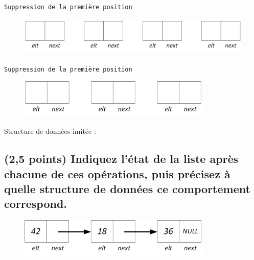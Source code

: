 \documentclass[11pt,a4paper]{article}
\begin{document}
\begin{center}
\texttt{Suppression de la première position}

\begin{figure}[ht!]
\centering
\centerline{  %
\includegraphics[height=1.85cm]{img/Liste_p_vide_4.png}
}
\end{figure}


\texttt{Suppression de la première position}

\begin{figure}[ht!]
\centering
\centerline{  %
\includegraphics[height=1.85cm]{img/Liste_p_vide_3.png}
}
\end{figure}

\bigskip

\end{center}

Structure de données imitée :



\newpage

\subsection{(2,5 points) Indiquez l'état de la liste après chacune de ces opérations, puis précisez à quelle structure de données ce comportement correspond. }


\begin{figure}[ht!]
\centering
\centerline{  %
\includegraphics[height=1.85cm]{img/Liste_p_1.png}
}
\end{figure}
\end{document}
